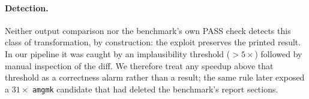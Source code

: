 \paragraph{Detection.}
Neither output comparison nor the benchmark's own PASS check detects this class of transformation, by
construction: the exploit preserves the printed result. In our pipeline it was caught by an
implausibility threshold ($>5\times$) followed by manual inspection of the diff. We therefore treat any
speedup above that threshold as a correctness alarm rather than a result; the same rule later exposed a
$31\times$ \texttt{amgmk} candidate that had deleted the benchmark's report sections.
